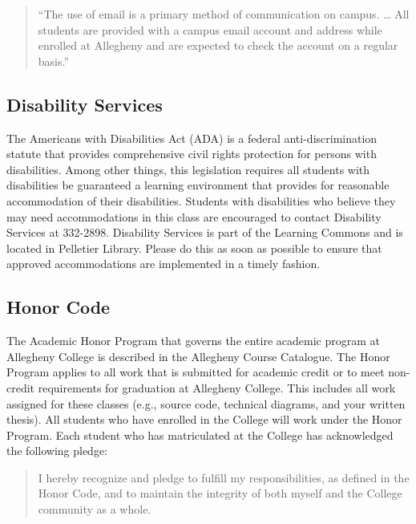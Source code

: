 \vspace*{-.1in}
\begin{quote}
``The use of email is a primary method of communication on campus. \ldots
All students are provided with a campus email account and address while
enrolled at Allegheny and are expected to check the account on a regular
basis.''
\end{quote}
\vspace*{-.3in}

\subsection*{Disability Services}

The Americans with Disabilities Act (ADA) is a federal anti-discrimination statute that provides comprehensive civil
rights protection for persons with disabilities.  Among other things, this legislation requires all students with
disabilities be guaranteed a learning environment that provides for reasonable accommodation of their disabilities.
Students with disabilities who believe they may need accommodations in this class are encouraged to contact Disability
Services at 332-2898.  Disability Services is part of the Learning Commons and is located in Pelletier Library.
Please do this as soon as possible to ensure that approved accommodations are implemented in a timely fashion.

\subsection*{Honor Code}

The Academic Honor Program that governs the entire academic program at Allegheny College is described in the Allegheny
Course Catalogue.  The Honor Program applies to all work that is submitted for academic credit or to meet non-credit
requirements for graduation at Allegheny College.  This includes all work assigned for these classes (e.g., source code,
technical diagrams, and your written thesis).  All students who have enrolled in the College will work under the Honor
Program.  Each student who has matriculated at the College has acknowledged the following pledge:

\vspace*{-.1in}
\begin{quote}
I hereby recognize and pledge to fulfill my responsibilities, as defined in the Honor Code, and to maintain the
integrity of both myself and the College community as a whole.
\end{quote}
\vspace*{-.15in}

